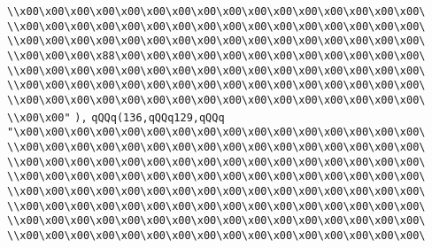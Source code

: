 \verb|\\x00\x00\x00\x00\x00\x00\x00\x00\x00\x00\x00\x00\x00\x00\x00\x00\|\newline
\verb|\\x00\x00\x00\x00\x00\x00\x00\x00\x00\x00\x00\x00\x00\x00\x00\x00\|\newline
\verb|\\x00\x00\x00\x00\x00\x00\x00\x00\x00\x00\x00\x00\x00\x00\x00\x00\|\newline
\verb|\\x00\x00\x00\x88\x00\x00\x00\x00\x00\x00\x00\x00\x00\x00\x00\x00\|\newline
\verb|\\x00\x00\x00\x00\x00\x00\x00\x00\x00\x00\x00\x00\x00\x00\x00\x00\|\newline
\verb|\\x00\x00\x00\x00\x00\x00\x00\x00\x00\x00\x00\x00\x00\x00\x00\x00\|\newline
\verb|\\x00\x00\x00\x00\x00\x00\x00\x00\x00\x00\x00\x00\x00\x00\x00\x00\|\newline
\verb|\\x00\x00"|\newline
\verb|),|\newline
\verb|qQQq(136,qQQq129,qQQq|\newline
\verb|"\x00\x00\x00\x00\x00\x00\x00\x00\x00\x00\x00\x00\x00\x00\x00\x00\|\newline
\verb|\\x00\x00\x00\x00\x00\x00\x00\x00\x00\x00\x00\x00\x00\x00\x00\x00\|\newline
\verb|\\x00\x00\x00\x00\x00\x00\x00\x00\x00\x00\x00\x00\x00\x00\x00\x00\|\newline
\verb|\\x00\x00\x00\x00\x00\x00\x00\x00\x00\x00\x00\x00\x00\x00\x00\x00\|\newline
\verb|\\x00\x00\x00\x00\x00\x00\x00\x00\x00\x00\x00\x00\x00\x00\x00\x00\|\newline
\verb|\\x00\x00\x00\x00\x00\x00\x00\x00\x00\x00\x00\x00\x00\x00\x00\x00\|\newline
\verb|\\x00\x00\x00\x00\x00\x00\x00\x00\x00\x00\x00\x00\x00\x00\x00\x00\|\newline
\verb|\\x00\x00\x00\x00\x00\x00\x00\x00\x00\x00\x00\x00\x00\x00\x00\x00\|\newline
